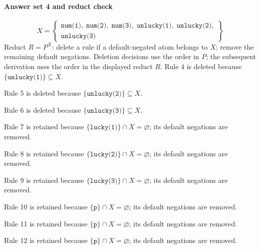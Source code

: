 \documentclass[a4paper,11pt]{article}
\newcommand{\at}[1]{\texttt{#1}}
\begin{document}
\paragraph{Answer set 4 and reduct check}
\[
X=\left\{\begin{gathered}\at{num(1)},\;\at{num(2)},\;\at{num(3)},\;\at{unlucky(1)},\;\at{unlucky(2)},\\\at{unlucky(3)}\end{gathered}\right\}
\]
Reduct $R=P^X$: delete a rule if a default-negated atom belongs to $X$; remove the remaining default negations. Deletion decisions use the order in $P$; the subsequent derivation uses the order in the displayed reduct $R$.
Rule 4 is deleted because $\{\at{unlucky(1)}\}\subseteq X$.

Rule 5 is deleted because $\{\at{unlucky(2)}\}\subseteq X$.

Rule 6 is deleted because $\{\at{unlucky(3)}\}\subseteq X$.

Rule 7 is retained because $\{\at{lucky(1)}\}\cap X=\varnothing$; its default negations are removed.

Rule 8 is retained because $\{\at{lucky(2)}\}\cap X=\varnothing$; its default negations are removed.

Rule 9 is retained because $\{\at{lucky(3)}\}\cap X=\varnothing$; its default negations are removed.

Rule 10 is retained because $\{\at{p}\}\cap X=\varnothing$; its default negations are removed.

Rule 11 is retained because $\{\at{p}\}\cap X=\varnothing$; its default negations are removed.

Rule 12 is retained because $\{\at{p}\}\cap X=\varnothing$; its default negations are removed.
\end{document}
